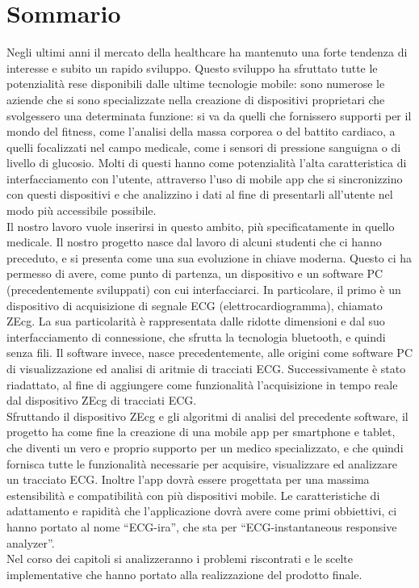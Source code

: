 \chapter{Sommario}
Negli ultimi anni il mercato della healthcare ha mantenuto una forte tendenza di interesse e subito un rapido sviluppo. Questo sviluppo ha sfruttato tutte le potenzialità rese disponibili dalle ultime tecnologie mobile: sono numerose le aziende che si sono specializzate nella creazione di dispositivi proprietari che svolgessero una determinata funzione: si va da quelli che fornissero supporti per il mondo del fitness, come l’analisi della massa corporea o del battito cardiaco, a quelli focalizzati nel campo medicale, come i sensori di pressione sanguigna o di livello di glucosio. Molti di questi hanno come potenzialità l’alta caratteristica di interfacciamento con l’utente, attraverso l’uso di mobile app che si sincronizzino con questi dispositivi e che analizzino i dati al fine di presentarli all’utente nel modo più accessibile possibile.\\
Il nostro lavoro vuole inserirsi in questo ambito, più specificatamente in quello medicale. Il nostro progetto nasce dal lavoro di alcuni studenti che ci hanno preceduto, e si presenta come una sua evoluzione in chiave moderna. Questo ci ha permesso di avere, come punto di partenza, un dispositivo e un software PC (precedentemente sviluppati) con cui interfacciarci. In particolare, il primo è un dispositivo di acquisizione di segnale ECG (elettrocardiogramma), chiamato ZEcg. La sua particolarità è rappresentata dalle ridotte dimensioni e dal suo interfacciamento di connessione, che sfrutta la tecnologia bluetooth, e quindi senza fili. Il software invece, nasce precedentemente, alle origini come software PC di visualizzazione ed analisi di aritmie di tracciati ECG. Successivamente è stato riadattato, al fine di aggiungere come funzionalità l’acquisizione in tempo reale dal dispositivo ZEcg di tracciati ECG.\\
Sfruttando il dispositivo ZEcg e gli algoritmi di analisi del precedente software, il progetto ha come fine la creazione di una mobile app per smartphone e tablet, che diventi un vero e proprio supporto per un medico specializzato, e che quindi fornisca tutte le funzionalità necessarie per acquisire, visualizzare ed analizzare un tracciato ECG. Inoltre l’app dovrà essere progettata per una massima estensibilità e compatibilità con più dispositivi mobile. Le caratteristiche di adattamento e rapidità che l’applicazione dovrà avere come primi obbiettivi, ci hanno portato al nome “ECG-ira”, che sta per “ECG-instantaneous responsive analyzer”. \\
Nel corso dei capitoli si analizzeranno i problemi riscontrati e le scelte implementative che hanno portato alla realizzazione del prodotto finale.


